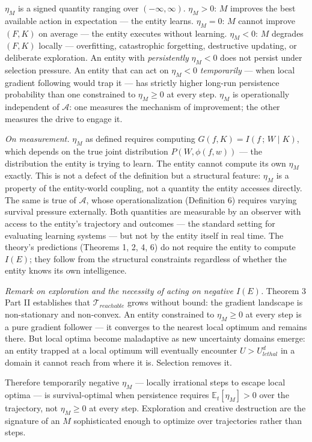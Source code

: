 \documentclass[
]{article}
\begin{document}
\(\eta_M\) is a signed quantity ranging over \((-\infty, \infty)\).
\(\eta_M > 0\): \(M\) improves the best available action in expectation
--- the entity learns. \(\eta_M = 0\): \(M\) cannot improve \((F, K)\)
on average --- the entity executes without learning. \(\eta_M < 0\):
\(M\) degrades \((F, K)\) locally --- overfitting, catastrophic
forgetting, destructive updating, or deliberate exploration. An entity
with \emph{persistently} \(\eta_M < 0\) does not persist under selection
pressure. An entity that can act on \(\eta_M < 0\) \emph{temporarily}
--- when local gradient following would trap it --- has strictly higher
long-run persistence probability than one constrained to
\(\eta_M \geq 0\) at every step. \(\eta_M\) is operationally independent
of \(\mathcal{A}\): one measures the mechanism of improvement; the other
measures the drive to engage it.

\emph{On measurement.} \(\eta_M\) as defined requires computing
\(G(f, K) = I(f\,;\, W \mid K)\), which depends on the true joint
distribution \(P(W, \phi(f,w))\) --- the distribution the entity is
trying to learn. The entity cannot compute its own \(\eta_M\) exactly.
This is not a defect of the definition but a structural feature:
\(\eta_M\) is a property of the entity-world coupling, not a quantity
the entity accesses directly. The same is true of \(\mathcal{A}\), whose
operationalization (Definition 6) requires varying survival pressure
externally. Both quantities are measurable by an observer with access to
the entity's trajectory and outcomes --- the standard setting for
evaluating learning systems --- but not by the entity itself in real
time. The theory's predictions (Theorems 1, 2, 4, 6) do not require
the entity to compute \(I(E)\); they follow from the structural
constraints regardless of whether the entity knows its own intelligence.

\emph{Remark on exploration and the necessity of acting on negative
\(I(E)\).} Theorem 3 Part II establishes that
\(\mathcal{T}_{reachable}\) grows without bound: the gradient landscape
is non-stationary and non-convex. An entity constrained to
\(\eta_M \geq 0\) at every step is a pure gradient follower --- it
converges to the nearest local optimum and remains there. But local
optima become maladaptive as new uncertainty domains emerge: an entity
trapped at a local optimum will eventually encounter
\(U > U_{lethal}^d\) in a domain it cannot reach from where it is.
Selection removes it.

Therefore temporarily negative \(\eta_M\) --- locally irrational steps
to escape local optima --- is survival-optimal when persistence requires
\(\mathbb{E}_t[\eta_M] > 0\) over the trajectory, not
\(\eta_M \geq 0\) at every step. Exploration and creative destruction
are the signature of an \(M\) sophisticated enough to optimize over
trajectories rather than steps.
\end{document}
